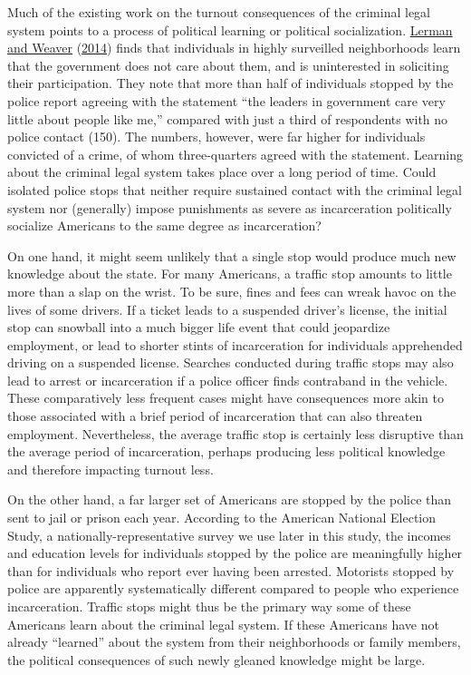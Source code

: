 \documentclass[
  12pt,
]{article}
\begin{document}
Much of the existing work on the turnout consequences of the criminal legal system points to a process of political learning or political socialization. \protect\hyperlink{ref-Lerman2014}{Lerman and Weaver} (\protect\hyperlink{ref-Lerman2014}{2014}) finds that individuals in highly surveilled neighborhoods learn that the government does not care about them, and is uninterested in soliciting their participation. They note that more than half of individuals stopped by the police report agreeing with the statement ``the leaders in government care very little about people like me,'' compared with just a third of respondents with no police contact (150). The numbers, however, were far higher for individuals convicted of a crime, of whom three-quarters agreed with the statement. Learning about the criminal legal system takes place over a long period of time. Could isolated police stops that neither require sustained contact with the criminal legal system nor (generally) impose punishments as severe as incarceration politically socialize Americans to the same degree as incarceration?

On one hand, it might seem unlikely that a single stop would produce much new knowledge about the state. For many Americans, a traffic stop amounts to little more than a slap on the wrist. To be sure, fines and fees can wreak havoc on the lives of some drivers. If a ticket leads to a suspended driver's license, the initial stop can snowball into a much bigger life event that could jeopardize employment, or lead to shorter stints of incarceration for individuals apprehended driving on a suspended license. Searches conducted during traffic stops may also lead to arrest or incarceration if a police officer finds contraband in the vehicle. These comparatively less frequent cases might have consequences more akin to those associated with a brief period of incarceration that can also threaten employment. Nevertheless, the average traffic stop is certainly less disruptive than the average period of incarceration, perhaps producing less political knowledge and therefore impacting turnout less.

On the other hand, a far larger set of Americans are stopped by the police than sent to jail or prison each year. According to the American National Election Study, a nationally-representative survey we use later in this study, the incomes and education levels for individuals stopped by the police are meaningfully higher than for individuals who report ever having been arrested. Motorists stopped by police are apparently systematically different compared to people who experience incarceration. Traffic stops might thus be the primary way some of these Americans learn about the criminal legal system. If these Americans have not already ``learned'' about the system from their neighborhoods or family members, the political consequences of such newly gleaned knowledge might be large.
\end{document}
